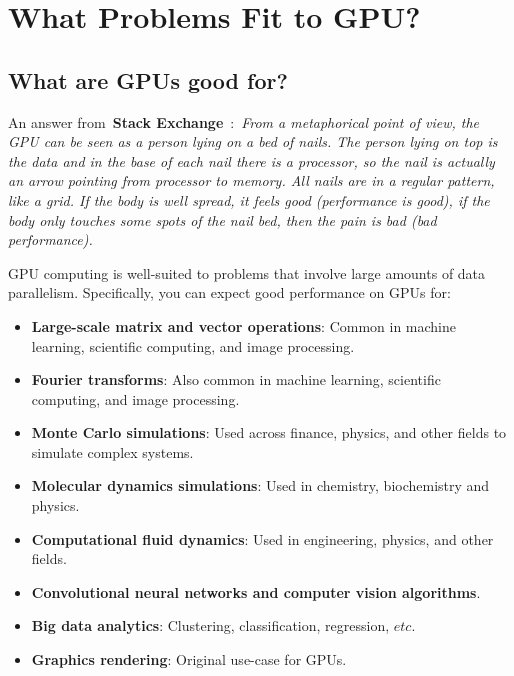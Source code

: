 \section{What Problems Fit to GPU?}


\subsection{What are GPUs good for?}

\par
An answer from~\textbf{Stack Exchange}~\cite{stackexchange}:~\emph{From a metaphorical point of view, the GPU can be seen as a person lying on a bed of nails. The person lying on top is the data and in the base of each nail there is a processor, so the nail is actually an arrow pointing from processor to memory. All nails are in a regular pattern, like a grid. If the body is well spread, it feels good (performance is good), if the body only touches some spots of the nail bed, then the pain is bad (bad performance).}


\par
GPU computing is well-suited to problems that involve large amounts of data parallelism.
Specifically, you can expect good performance on GPUs for:
\begin{itemize}
    \item \textbf{Large-scale matrix and vector operations}: Common in machine learning, scientific computing, and image processing.
    \item \textbf{Fourier transforms}: Also common in machine learning, scientific computing, and image processing.
    \item \textbf{Monte Carlo simulations}: Used across finance, physics, and other fields to simulate complex systems.
    \item \textbf{Molecular dynamics simulations}: Used in chemistry, biochemistry and physics.
    \item \textbf{Computational fluid dynamics}: Used in engineering, physics, and other fields.
    \item \textbf{Convolutional neural networks and computer vision algorithms}.
    \item \textbf{Big data analytics}: Clustering, classification, regression, $etc$.
    \item \textbf{Graphics rendering}: Original use-case for GPUs.
\end{itemize}




